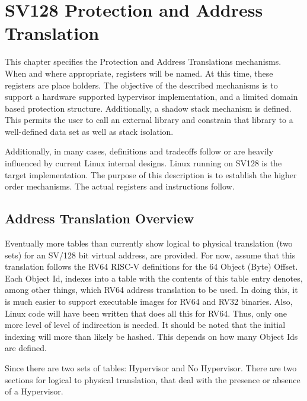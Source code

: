 \documentclass{article}
\begin{document}
\section{SV128 Protection and Address Translation} 

This chapter specifies  the Protection and Address Translations mechanisms. When and where appropriate,  registers will be named.  At this time,  these registers are place holders. The objective of the described mechanisms is to support a hardware supported hypervisor implementation, and a limited domain based protection structure.  Additionally, a shadow stack mechanism is defined.  This permits the user to call an external library and constrain that library to  a well-defined data set as well as stack isolation.  

Additionally, in many cases,  definitions and tradeoffs follow or are heavily influenced by current Linux internal designs.   Linux running on SV128 is the target implementation. The purpose of this description is to establish the higher order mechanisms.  The actual registers and instructions follow. 

\subsection {Address Translation Overview}

Eventually more tables than currently show logical to physical translation (two sets) for an SV/128 bit virtual address, are provided.    For now, assume that this translation follows the RV64 RISC-V definitions for the 64 Object  (Byte) Offset.  Each Object Id,  indexes into a table   with the contents of this table entry denotes, among other things,  which RV64 address translation to be used.   In doing this,   it is much easier to support executable images for RV64 and RV32 binaries.  Also, Linux code will have been written that does all this for RV64.  Thus, only one more level of level of indirection is needed. It should be noted that the initial  indexing will more than likely be hashed.  This depends on how many Object Ids  are defined.

Since there are two sets of tables:  Hypervisor and No  Hypervisor.   There are two sections for logical to physical translation,  that deal with the presence or absence of a Hypervisor.
\end{document}
